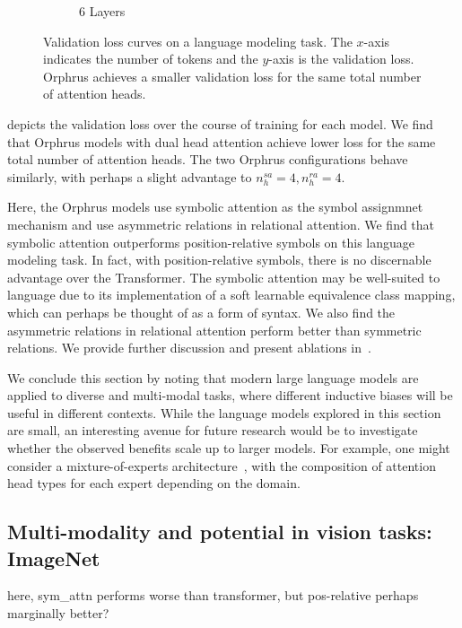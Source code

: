 \begin{figure}[ht]
\begin{subfigure}{0.33\textwidth}
        \caption{6 Layers}
    \end{subfigure}
    \caption{Validation loss curves on a language modeling task. The $x$-axis indicates the number of tokens and the $y$-axis is the validation loss. Orphrus achieves a smaller validation loss for the same total number of attention heads.}\label{fig:tiny_stories_val_loss_curves}
\end{figure}

 depicts the validation loss over the course of training for each model. We find that Orphrus models with dual head attention achieve lower loss for the same total number of attention heads. The two Orphrus configurations behave similarly, with perhaps a slight advantage to $n_h^{sa} = 4, n_h^{ra} = 4$.

Here, the Orphrus models use symbolic attention as the symbol assignmnet mechanism and use asymmetric relations in relational attention. We find that symbolic attention outperforms position-relative symbols on this language modeling task. In fact, with position-relative symbols, there is no discernable advantage over the Transformer. The symbolic attention may be well-suited to language due to its implementation of a soft learnable equivalence class mapping, which can perhaps be thought of as a form of syntax. We also find the asymmetric relations in relational attention perform better than symmetric relations. We provide further discussion and present ablations in~.

We conclude this section by noting that modern large language models are applied to diverse and multi-modal tasks, where different inductive biases will be useful in different contexts. While the language models explored in this section are small, an interesting avenue for future research would be to investigate whether the observed benefits scale up to larger models. For example, one might consider a mixture-of-experts architecture~\citep{shazeer2017outrageously,fedus2022switch,duGLaM2022}, with the composition of attention head types for each expert depending on the domain.

\subsection{Multi-modality and potential in vision tasks: ImageNet}\label{ssec:imagenett}


here, sym\_attn performs worse than transformer, but pos-relative perhaps marginally better?